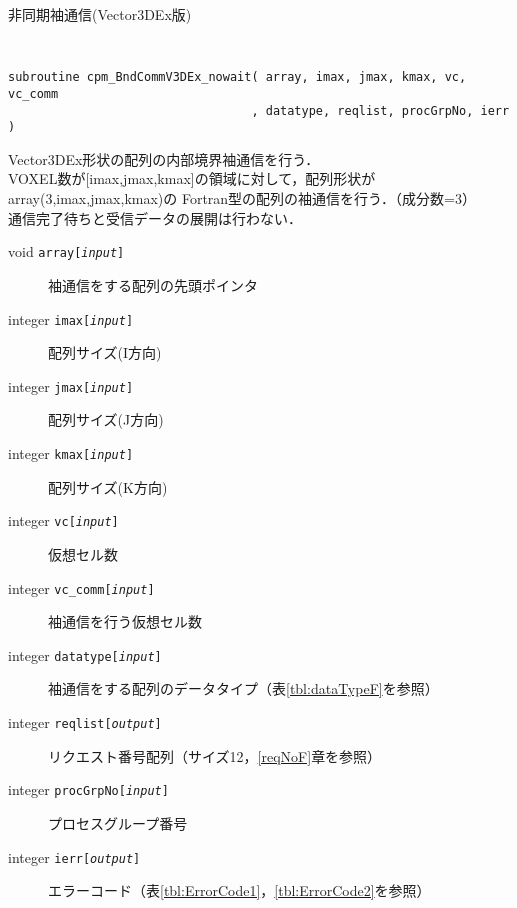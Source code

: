 \begin{spacing}{0.8}
\begin{itembox}[l]{非同期袖通信(Vector3DEx版)}
{\tt
\begin{verbatim}
subroutine cpm_BndCommV3DEx_nowait( array, imax, jmax, kmax, vc, vc_comm
                                  , datatype, reqlist, procGrpNo, ierr )
\end{verbatim}
}
Vector3DEx形状の配列の内部境界袖通信を行う．\\
VOXEL数が[imax,jmax,kmax]の領域に対して，配列形状がarray(3,imax,jmax,kmax)の
Fortran型の配列の袖通信を行う．（成分数=3）\\
通信完了待ちと受信データの展開は行わない．
\begin{description}
\item[void    {\tt array[{\it input}]}] 袖通信をする配列の先頭ポインタ
\item[integer {\tt imax[{\it input}]}] 配列サイズ(I方向)
\item[integer {\tt jmax[{\it input}]}] 配列サイズ(J方向)
\item[integer {\tt kmax[{\it input}]}] 配列サイズ(K方向)
\item[integer {\tt vc[{\it input}]}] 仮想セル数
\item[integer {\tt vc\_comm[{\it input}]}] 袖通信を行う仮想セル数
\item[integer {\tt datatype[{\it input}]}] 袖通信をする配列のデータタイプ（表\ref{tbl:dataTypeF}を参照）
\item[integer {\tt reqlist[{\it output}]}] リクエスト番号配列（サイズ12，\ref{reqNoF}章を参照）
\item[integer {\tt procGrpNo[{\it input}]}] プロセスグループ番号
\item[integer {\tt ierr[{\it output}]}] エラーコード（表\ref{tbl:ErrorCode1}，\ref{tbl:ErrorCode2}を参照）
\end{description}
\end{itembox}\\
\end{spacing}

